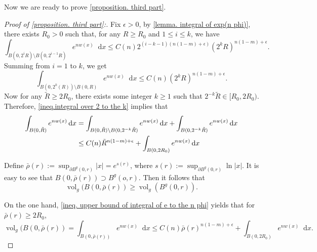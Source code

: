 \documentclass[12pt]{amsart}
\theoremstyle{plain}
\theoremstyle{definition}
\theoremstyle{remark}     %
\numberwithin{equation}{section}
\newcommand{\dx}{\mathop{}\!\mathrm{d}x}
\begin{document}
Now we are ready to prove \cref{proposition. third part}.
\begin{proof}[Proof of \cref{proposition. third part}:]
    Fix $\epsilon>0$, by \cref{lemma. integral of exp(n phi)}, there exists $R_0>0$ such that, for any $R\geq R_0$ and $1\leq i\leq k$, we have
    \[
        \int_{B(0,2^iR)\setminus B(0,2^{i-1}R) }e^{nw(x)}\dx
        \leq C(n)2^{(i-k-1)(n(1-m)+\epsilon)}(2^k R)^{n(1-m)+\epsilon}.
    \]
    Summing from $i=1$ to $k$, we get
    \begin{equation}\label{ineq.integral over 2 to the k}
        \int_{B(0,2^k(R))\setminus B(0,R)}e^{nw(x)}\dx
        \leq C(n)(2^k R)^{n(1-m)+\epsilon}.
    \end{equation}
    Now for any $\tilde{R}\geq 2R_0$, there exists some integer $k\geq 1$ such that $2^{-k}\tilde{R}\in[R_0, 2R_0)$. Therefore, \cref{ineq.integral over 2 to the k} implies that
    \begin{align}
        \int_{B(0,\tilde{R})}e^{nw(x)}\dx
        &=\int_{B(0,\tilde{R})\setminus B(0,2^{-k}\tilde{R}) }
        e^{nw(x)}\dx
        +\int_{B(0,2^{-k}\tilde{R})}
        e^{nw(x)}\dx\notag\\
        &\leq C(n) \tilde{R}^{n(1-m)+\epsilon}
        +\int_{B(0,2R_0)}
        e^{nw(x)}\dx\label{ineq. upper bound of integral of e to the n phi}
    \end{align}

    Define $\bar{\rho}(r):=\sup_{\partial B^g(0,r) }|x|=e^{s(r)}$, where $s(r):=\sup_{\partial B^g(0,r)}\ln |x| $. It is easy to see that 
    $B(0,\bar{\rho}(r))\supset B^g(o,r)$.
    Then it follows that
    \begin{equation}\label{eq.supset volume relation}
        \operatorname{vol}_g(B(0,\bar{\rho}(r))
        \geq \operatorname{vol}_g(B^g(0,r)).
    \end{equation}

    On the one hand, \cref{ineq. upper bound of integral of e to the n phi} yields that for $\bar{\rho}(r)\geq 2R_0$,
    \[
        \operatorname{vol}_g(B(0,\bar{\rho}(r))
        =\int_{B(0,\bar{\rho}(r))} e^{nw(x)}\dx
        \leq
        C(n)\bar{\rho}(r)^{n(1-m)+\epsilon}
        +\int_{B(0,2R_0)}
        e^{nw(x)}\dx. 
    \]
    

\end{proof}
\end{document}
